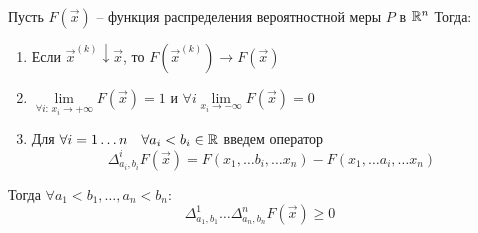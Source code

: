 \begin{lemma}~

	Пусть $F(\vec{x})$ -- функция распределения вероятностной меры $P$ в $\mathbb{R}^n$ Тогда:
	\begin{enumerate}
		\item	Если $\vec{x}^{(k)} \downarrow \vec{x}$, то $F(\vec{x}^{(k)}) \to F(\vec{x})$
		
		\item 
			$\lim\limits_{\forall i: \, x_i \rightarrow +\infty} F(\vec{x}) = 1$ и 
			$\forall i \lim\limits_{x_i \rightarrow -\infty}	F(\vec{x}) = 0$
		
		\item	
			Для $\forall i = 1 \ldots n\quad \forall a_i < b_i \in \mathbb{R}$ введем оператор 
			\begin{equation*}
				\Delta_{a_i, b_i}^{i} F(\vec{x}) = 
					F(x_1, \ldots b_i, \ldots x_n) - F(x_1, \ldots a_i, \ldots x_n)
			\end{equation*}
		
	\end{enumerate}
	
	Тогда $\forall a_1 < b_1, \ldots, a_n < b_n$:
	\begin{equation*}
		\Delta_{a_1, b_1}^{1} \ldots \Delta_{a_n, b_n}^{n} F(\vec{x}) \geq 0
	\end{equation*}
\end{lemma}


